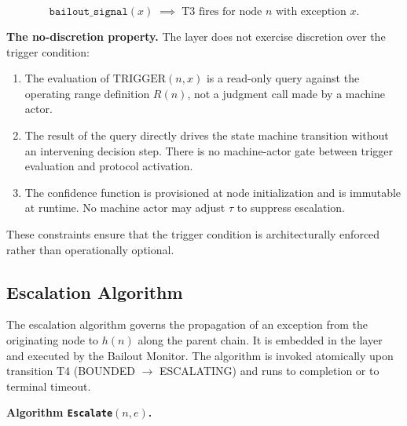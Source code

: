 \begin{equation}
\texttt{bailout\_signal}(x) \;\implies\; \text{T3 fires for node } n \text{ with exception } x. \tag{TC-secondary}
\end{equation}

\bigskip
\noindent\textbf{The no-discretion property.} The \bounds{} layer does not exercise discretion over the trigger condition:

\begin{enumerate}
    \item The evaluation of $\text{TRIGGER}(n, x)$ is a read-only query against the operating range definition $R(n)$, not a judgment call made by a machine actor.
    \item The result of the query directly drives the state machine transition without an intervening decision step. There is no machine-actor gate between trigger evaluation and protocol activation.
    \item The confidence function is provisioned at node initialization and is immutable at runtime. No machine actor may adjust $\tau$ to suppress escalation.
\end{enumerate}

These constraints ensure that the trigger condition is architecturally enforced rather than operationally optional.

\subsection{Escalation Algorithm}\label{sec:escalation-algorithm}

The escalation algorithm governs the propagation of an exception from the originating node to $h(n)$ along the parent chain. It is embedded in the \fact{} layer and executed by the Bailout Monitor. The algorithm is invoked atomically upon transition T4 (BOUNDED $\rightarrow$ ESCALATING) and runs to completion or to terminal timeout.

\bigskip
\noindent\textbf{Algorithm \texttt{Escalate$(n, e)$}.}

